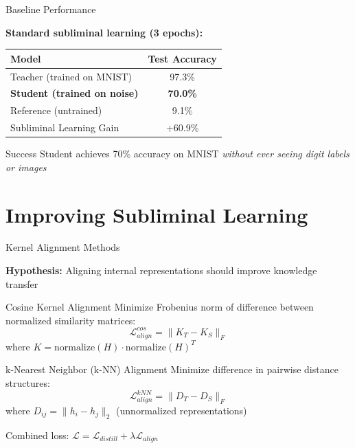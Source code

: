 \documentclass{beamer}
\begin{document}
\begin{frame}{Baseline Performance}

\textbf{Standard subliminal learning (3 epochs):}

\vspace{1em}

\begin{table}
\centering
\begin{tabular}{lc}
\toprule
Model & Test Accuracy \\
\midrule
Teacher (trained on MNIST) & 97.3\% \\
\textbf{Student (trained on noise)} & \textbf{70.0\%} \\
Reference (untrained) & 9.1\% \\
\midrule
Subliminal Learning Gain & +60.9\% \\
\bottomrule
\end{tabular}
\end{table}

\vspace{1em}

\begin{alertblock}{Success}
Student achieves 70\% accuracy on MNIST \emph{without ever seeing digit labels or images}
\end{alertblock}

\end{frame}

\section{Improving Subliminal Learning}

\begin{frame}{Kernel Alignment Methods}

\textbf{Hypothesis:} Aligning internal representations should improve knowledge transfer

\vspace{1em}

\begin{block}{Cosine Kernel Alignment}
Minimize Frobenius norm of difference between normalized similarity matrices:
$$\mathcal{L}_{align}^{cos} = \|K_T - K_S\|_F$$
where $K = \text{normalize}(H) \cdot \text{normalize}(H)^T$
\end{block}

\vspace{0.5em}

\begin{block}{k-Nearest Neighbor (k-NN) Alignment}
Minimize difference in pairwise distance structures:
$$\mathcal{L}_{align}^{kNN} = \|D_T - D_S\|_F$$
where $D_{ij} = \|h_i - h_j\|_2$ (unnormalized representations)
\end{block}

\vspace{0.5em}

Combined loss: $\mathcal{L} = \mathcal{L}_{distill} + \lambda \mathcal{L}_{align}$

\end{frame}
\end{document}
